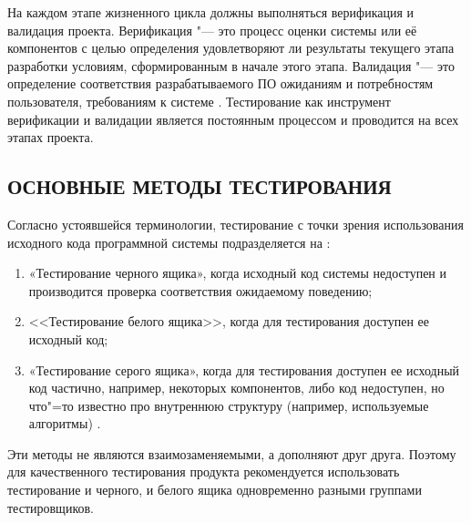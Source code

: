На каждом этапе жизненного цикла должны выполняться верификация и валидация 
проекта. Верификация "--- это процесс оценки системы или её компонентов с целью 
определения удовлетворяют ли результаты текущего этапа разработки условиям, 
сформированным в начале этого этапа. Валидация "--- это определение соответствия 
разрабатываемого ПО ожиданиям и потребностям пользователя, требованиям к системе 
\cite{BaseofTest}. Тестирование как инструмент верификации и валидации 
является постоянным процессом и проводится на всех этапах проекта.
\subsection{ОСНОВНЫЕ МЕТОДЫ ТЕСТИРОВАНИЯ}
Согласно устоявшейся терминологии, тестирование с точки зрения использования 
исходного кода программной системы подразделяется на \cite{Ivanova}:
\begin{enumerate}
    \item «Тестирование черного ящика», когда исходный код системы недоступен и 
    производится проверка соответствия ожидаемому поведению;
    \item <<Тестирование белого ящика>>, когда для тестирования доступен ее 
    исходный код;
    \item «Тестирование серого ящика», когда для тестирования доступен ее 
    исходный код частично, например, некоторых компонентов, либо код недоступен, 
    но что"=то известно про внутреннюю структуру (например, используемые 
    алгоритмы) \cite{Import_test}. 
\end{enumerate}
Эти методы не являются взаимозаменяемыми, а дополняют друг друга. Поэтому для 
качественного тестирования продукта рекомендуется использовать тестирование и 
черного, и белого ящика одновременно разными группами тестировщиков.


